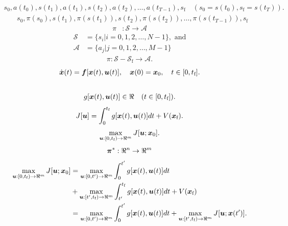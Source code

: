 \begin{align}
s_0, a(t_0), s(t_1), a(t_1), s(t_2), a(t_2), \dots, a(t_{T-1}), s_\text{f} \quad (s_0 = s(t_0), s_\text{f} = s(t_T)). 
\end{align}
\begin{align}
& s_0, \pi(s_0), s(t_1), \pi(s(t_1)), s(t_2), \pi(s(t_2)), \dots, \pi(s(t_{T-1})), s_\text{f}
\end{align}
\begin{align}
\pi &: \mathcal{S} \to \mathcal{A} \label{eq:policy_state_action_sequence}
\end{align}
\begin{align}
\mathcal{S} &= \{s_i | i=0,1,2,\dots,N-1 \}, \text{ and} \\
\mathcal{A} &= \{a_j | j=0,1,2,\dots,M-1 \}
\end{align}
\begin{align}
\pi : \mathcal{S} - \mathcal{S}_\text{f} \to \mathcal{A}. \label{eq:policy}
\end{align}
\begin{align}
\dot{\boldsymbol{x}}(t) &= \boldsymbol{f}[\boldsymbol{x}(t),\boldsymbol{u}(t)], \quad \boldsymbol{x}(0) = \boldsymbol{x}_0, \quad t \in [0,t_\text{f}].\label{eq:system} \\
&  \nonumber 
\end{align}
\begin{align}
g[\boldsymbol{x}(t), \boldsymbol{u}(t)] \in \Re \quad (t \in [0,t_\text{f}]). \label{eq:evaluation_function}
\end{align}
\begin{align}
J[\boldsymbol{u}] = \int_{0}^{t_\text{f}} g[\boldsymbol{x}(t), \boldsymbol{u}(t)] dt + V(\boldsymbol{x}_\text{f}).  \label{eq:functional}
\end{align}
\begin{align}
\max_{\boldsymbol{u}:[0,t_\text{f}) \to \Re^m} J[\boldsymbol{u};\boldsymbol{x}_0].  \label{eq:optimal_control_problem}
\end{align}
\begin{align}
\boldsymbol{\pi}^*: \Re^n \to \Re^m
\end{align}
\begin{align}
\max_{\boldsymbol{u}:[0,t_\text{f}) \to \Re^m} J[\boldsymbol{u};\boldsymbol{x}_0] &= \max_{\boldsymbol{u}:[0,t') \to \Re^m} \int_{0}^{t'} g[\boldsymbol{x}(t), \boldsymbol{u}(t)] dt \nonumber \\ &+ \max_{\boldsymbol{u}:[t',t_\text{f}) \to \Re^m} \int_{t'}^{t_\text{f}} g[\boldsymbol{x}(t), \boldsymbol{u}(t)] dt + V(\boldsymbol{x}_\text{f}) \nonumber \\
	&= \max_{\boldsymbol{u}:[0,t') \to \Re^m} \int_{0}^{t'} g[\boldsymbol{x}(t), \boldsymbol{u}(t)] dt + \max_{\boldsymbol{u}:[t',t_\text{f}) \to \Re^m} J[\boldsymbol{u};\boldsymbol{x}(t')]. \label{eq:j}
\end{align}
